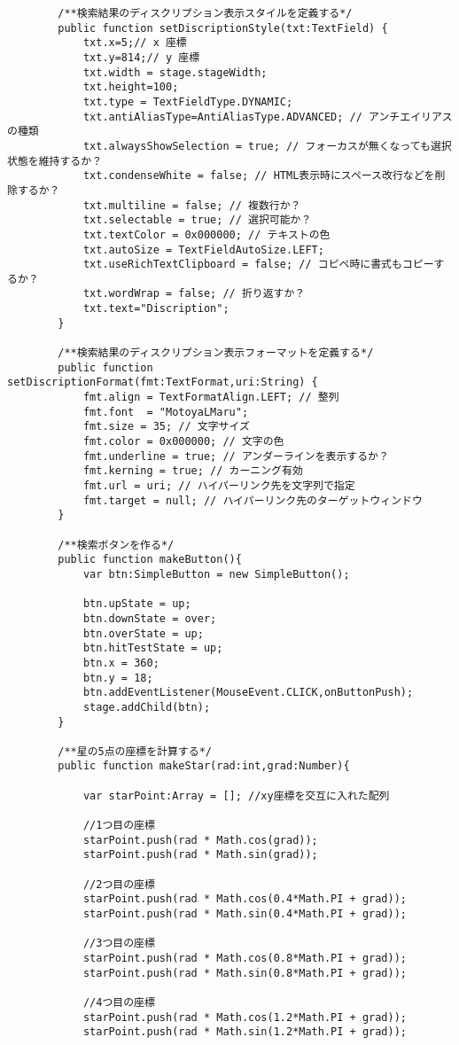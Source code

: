 {\begin{verbatim}
		/**検索結果のディスクリプション表示スタイルを定義する*/
		public function setDiscriptionStyle(txt:TextField) {
			txt.x=5;// x 座標
			txt.y=814;// y 座標
			txt.width = stage.stageWidth;
			txt.height=100;
			txt.type = TextFieldType.DYNAMIC;
			txt.antiAliasType=AntiAliasType.ADVANCED; // アンチエイリアスの種類
			txt.alwaysShowSelection = true; // フォーカスが無くなっても選択状態を維持するか？ 
			txt.condenseWhite = false; // HTML表示時にスペース改行などを削除するか？
			txt.multiline = false; // 複数行か？
			txt.selectable = true; // 選択可能か？
			txt.textColor = 0x000000; // テキストの色
			txt.autoSize = TextFieldAutoSize.LEFT;
			txt.useRichTextClipboard = false; // コピペ時に書式もコピーするか？
			txt.wordWrap = false; // 折り返すか？
			txt.text="Discription";
		}
		
		/**検索結果のディスクリプション表示フォーマットを定義する*/
		public function setDiscriptionFormat(fmt:TextFormat,uri:String) {
			fmt.align = TextFormatAlign.LEFT; // 整列
			fmt.font  = "MotoyaLMaru";
			fmt.size = 35; // 文字サイズ
			fmt.color = 0x000000; // 文字の色
			fmt.underline = true; // アンダーラインを表示するか？
			fmt.kerning = true; // カーニング有効
			fmt.url = uri; // ハイパーリンク先を文字列で指定
			fmt.target = null; // ハイパーリンク先のターゲットウィンドウ
		}
		
		/**検索ボタンを作る*/
		public function makeButton(){
			var btn:SimpleButton = new SimpleButton();
			
			btn.upState = up;
			btn.downState = over;
			btn.overState = up;
			btn.hitTestState = up;
			btn.x = 360;
			btn.y = 18;
			btn.addEventListener(MouseEvent.CLICK,onButtonPush);
			stage.addChild(btn);
		}
		
		/**星の5点の座標を計算する*/
		public function makeStar(rad:int,grad:Number){
			
			var starPoint:Array = []; //xy座標を交互に入れた配列
			
			//1つ目の座標
			starPoint.push(rad * Math.cos(grad));
			starPoint.push(rad * Math.sin(grad));
			
			//2つ目の座標
			starPoint.push(rad * Math.cos(0.4*Math.PI + grad));
			starPoint.push(rad * Math.sin(0.4*Math.PI + grad));
			
			//3つ目の座標
			starPoint.push(rad * Math.cos(0.8*Math.PI + grad));
			starPoint.push(rad * Math.sin(0.8*Math.PI + grad));
			
			//4つ目の座標
			starPoint.push(rad * Math.cos(1.2*Math.PI + grad));
			starPoint.push(rad * Math.sin(1.2*Math.PI + grad));
			

\end{verbatim}}
